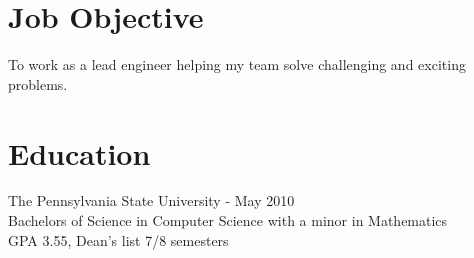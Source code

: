 \documentclass{res}
\begin{document}
 


\vspace{-24pt}
\address{bennet.huber@gmail.com\\(215) 490-4297}
\address{1219 NW Richmond Beach Rd\\Shoreline, WA 98177}

\begin{resume}

\section{Job Objective}
    To work as a lead engineer helping my team solve challenging and exciting problems.
 
\section{Education}
    The Pennsylvania State University - May 2010\\
    Bachelors of Science in Computer Science with a minor in Mathematics\\
    GPA 3.55, Dean's list 7/8 semesters
 

\end{resume}
\end{document}
